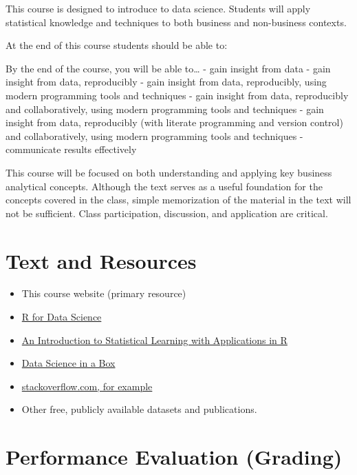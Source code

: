 \documentclass[
]{book}
\providecommand{\tightlist}{%
  \setlength{\itemsep}{0pt}\setlength{\parskip}{0pt}}
\theoremstyle{definition}
\theoremstyle{definition}
\theoremstyle{definition}
\theoremstyle{definition}
\theoremstyle{remark}
\begin{document}
This course is designed to introduce to data science. Students will apply statistical knowledge and techniques to both business and non-business contexts.

At the end of this course students should be able to:

By the end of the course, you will be able to\ldots{}
- gain insight from data
- gain insight from data, reproducibly
- gain insight from data, reproducibly, using modern programming tools and techniques
- gain insight from data, reproducibly and collaboratively, using modern programming tools and techniques
- gain insight from data, reproducibly (with literate programming and version control) and collaboratively, using modern programming tools and techniques
- communicate results effectively

This course will be focused on both understanding and applying key business analytical concepts. Although the text serves as a useful foundation for the concepts covered in the class, simple memorization of the material in the text will not be sufficient. Class participation, discussion, and application are critical.

\hypertarget{text-and-resources}{%
\section{Text and Resources}\label{text-and-resources}}

\begin{itemize}
\tightlist
\item
  This course website (primary resource)
\item
  \href{https://r4ds.had.co.nz/}{R for Data Science}
\item
  \href{https://trevorhastie.github.io/ISLR/}{An Introduction to Statistical Learning with Applications in R}
\item
  \href{https://datasciencebox.org/}{Data Science in a Box}
\item
  \href{https://stackoverflow.com/questions/4862178/remove-rows-with-all-or-some-nas-missing-values-in-data-frame?rq=1}{stackoverflow.com, for example}
\item
  Other free, publicly available datasets and publications.
\end{itemize}

\hypertarget{performance-evaluation-grading}{%
\section{Performance Evaluation (Grading)}\label{performance-evaluation-grading}}
\end{document}
